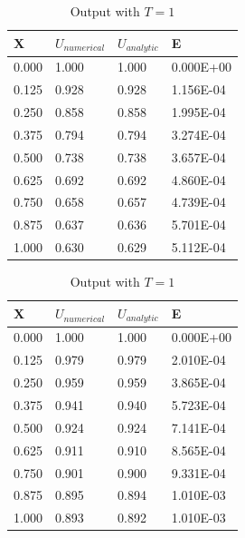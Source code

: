 \documentclass[10pt,a4paper]{report}
\begin{document}
\begin{table}[h]
\begin{minipage}[b]{0.5\linewidth}
\centering

\begin{tabular}{|l|l|l|l|}
\hline
X & $U_{numerical}$ & $U_{analytic}$ & E \\ \hline
0.000      & 1.000       & 1.000  & 0.000E+00            \\ \hline
0.125      & 0.928       & 0.928  & 1.156E-04            \\ \hline
0.250      & 0.858       & 0.858  & 1.995E-04            \\ \hline
0.375      & 0.794       & 0.794  & 3.274E-04            \\ \hline
0.500      & 0.738       & 0.738  & 3.657E-04            \\ \hline
0.625      & 0.692       & 0.692  & 4.860E-04            \\ \hline
0.750      & 0.658       & 0.657  & 4.739E-04            \\ \hline
0.875      & 0.637       & 0.636  & 5.701E-04            \\ \hline
1.000      & 0.630       & 0.629  & 5.112E-04            \\ \hline
\end{tabular}

\caption{Output with $T=0.5$}
\end{minipage}
\hspace{0.5cm}
\begin{minipage}[b]{0.5\linewidth}
\centering
\begin{tabular}{|l|l|l|l|}
\hline
X & $U_{numerical}$ & $U_{analytic}$ & E \\ \hline
0.000      & 1.000       & 1.000  & 0.000E+00            \\ \hline
0.125      & 0.979       & 0.979  & 2.010E-04            \\ \hline
0.250      & 0.959       & 0.959  & 3.865E-04            \\ \hline
0.375      & 0.941       & 0.940  & 5.723E-04            \\ \hline
0.500      & 0.924       & 0.924  & 7.141E-04            \\ \hline
0.625      & 0.911       & 0.910  & 8.565E-04            \\ \hline
0.750      & 0.901       & 0.900  & 9.331E-04            \\ \hline
0.875      & 0.895       & 0.894  & 1.010E-03            \\ \hline
1.000      & 0.893       & 0.892  & 1.010E-03            \\ \hline
\end{tabular}
\caption{Output with $T=1$}
\end{minipage}
\end{table}
\end{document}

